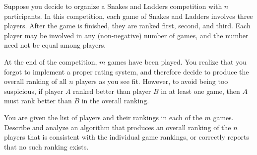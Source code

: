 \documentclass[11pt]{article}
\begin{document}
\noindent 
Suppose you decide to organize a Snakes and Ladders competition with $n$
participants. In this competition, each game of Snakes and Ladders involves
three players. After the game is finished, they are ranked first, second, and
third.  Each player may be involved in any (non-negative) number of games, and
the number need not be equal among players.

At the end of the competition, $m$ games have been played.  You realize that you
forgot to implement a proper rating system, and therefore decide to produce the
overall ranking of all $n$ players as you see fit.  However, to avoid being too
suspicious, if player $A$ ranked better than player $B$ in at least one game,
then $A$ must rank better than $B$ in the overall ranking.

You are given the list of players and their rankings in each of the $m$ games.
Describe and analyze an algorithm that produces an overall ranking of the $n$
players that is consistent with the individual game rankings, or correctly
reports that no such ranking exists.
\end{document}
